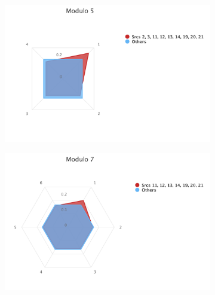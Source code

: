 \begin{figure}[ht]
\begin{adjustbox}{minipage=\linewidth,scale=0.8}
\begin{subfigure}{0.45\textwidth}
	\includegraphics[width=\linewidth]{tex/images/analysis/mod5}
\end{subfigure}
\hfill
\begin{subfigure}{0.45\textwidth}
	\includegraphics[width=\linewidth]{tex/images/analysis/mod7}
\end{subfigure}\\


\end{adjustbox}
\end{figure}
